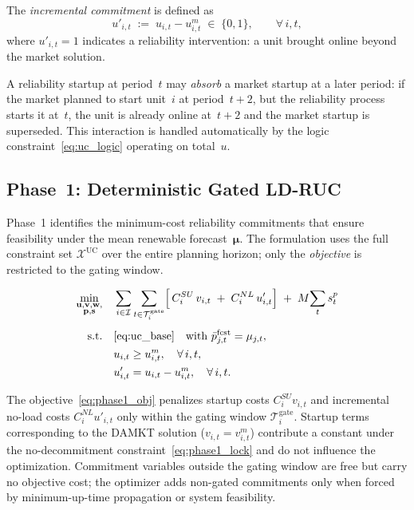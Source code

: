 \documentclass[journal]{IEEEtran}
\begin{document}
The \emph{incremental commitment} is defined as
\begin{equation}\label{eq:uprime}
    u'_{i,t} \;:=\; u_{i,t} - u_{i,t}^m \;\in\; \{0,1\},
    \qquad \forall\, i,t,
\end{equation}
where $u'_{i,t} = 1$ indicates a reliability intervention: a unit
brought online beyond the market solution.

A reliability startup at period~$t$ may \emph{absorb} a market
startup at a later period: if the market planned to start unit~$i$ at
period~$t{+}2$, but the reliability process starts it at~$t$, the
unit is already online at~$t{+}2$ and the market startup is
superseded.
This interaction is handled automatically by the logic
constraint~\eqref{eq:uc_logic} operating on total~$u$.

\subsection{Phase~1: Deterministic Gated LD-RUC}\label{sec:phase1}

Phase~1 identifies the minimum-cost reliability commitments that
ensure feasibility under the mean renewable forecast~$\boldsymbol{\mu}$.
The formulation uses the full constraint set
$\mathcal{X}^{\text{UC}}$ over the entire planning horizon; only the
\emph{objective} is restricted to the gating window.

\begin{subequations}\label{eq:phase1}
\begin{align}
\min_{\substack{
  \mathbf{u},\mathbf{v},\mathbf{w},\\
  \mathbf{p},\mathbf{s}}} \quad
& \sum_{i \in \mathcal{I}}
  \sum_{t \in \mathcal{T}_i^{\text{gate}}}
  \!\Big[\,
    C_i^{SU}\, v_{i,t}
    \;+\; C_i^{NL}\, u'_{i,t}
  \Big]
  \;+\; M \!\sum_{t} s_t^p
  \label{eq:phase1_obj} \\[4pt]
\text{s.t.}\quad
& \eqref{eq:uc_base}
  \quad\text{with } \bar{p}_{j,t}^{\text{fcst}} = \mu_{j,t},
  \label{eq:phase1_uc} \\
& u_{i,t} \geq u_{i,t}^m,
  \quad \forall\, i,t,
  \label{eq:phase1_lock} \\
& u'_{i,t} = u_{i,t} - u_{i,t}^m,
  \quad \forall\, i,t.
  \label{eq:phase1_uprime}
\end{align}
\end{subequations}

The objective~\eqref{eq:phase1_obj} penalizes startup costs
$C_i^{SU} v_{i,t}$ and incremental no-load costs
$C_i^{NL} u'_{i,t}$ only within the gating window
$\mathcal{T}_i^{\text{gate}}$.
Startup terms corresponding to the DAMKT solution
($v_{i,t} = v_{i,t}^m$) contribute a constant under the
no-decommitment constraint~\eqref{eq:phase1_lock} and do not
influence the optimization.
Commitment variables outside the gating window are free but carry no
objective cost; the optimizer adds non-gated commitments only when
forced by minimum-up-time propagation or system feasibility.
\end{document}
